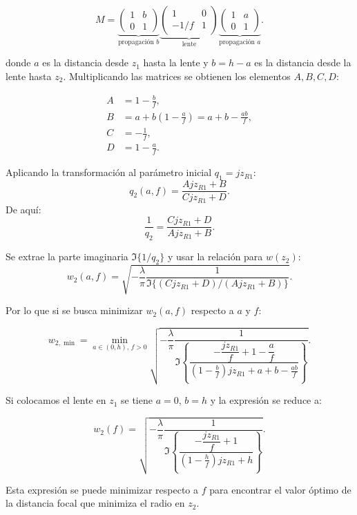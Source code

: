 \documentclass[11pt]{article}
\begin{document}
\[
M = 
\underbrace{\begin{pmatrix}1 & b\\ 0 & 1\end{pmatrix}}_{\text{propagación }b}
\underbrace{\begin{pmatrix}1 & 0\\ -1/f & 1\end{pmatrix}}_{\text{lente}}
\underbrace{\begin{pmatrix}1 & a\\ 0 & 1\end{pmatrix}}_{\text{propagación }a}.
\]

donde \(a\) es la distancia desde \(z_1\) hasta la lente y \(b = h-a\) es la distancia desde la lente hasta \(z_2\). Multiplicando las matrices se obtienen los elementos \(A,B,C,D\):

\begin{align*}
A &= 1 - \frac{b}{f},\\[4pt]
B &= a + b\left(1-\frac{a}{f}\right) = a + b - \frac{ab}{f},\\[4pt]
C &= -\frac{1}{f},\\[4pt]
D &= 1 - \frac{a}{f}.
\end{align*}

Aplicando la transformación al parámetro inicial \(q_1 = j z_{R1}\):
\[
q_2(a,f) = \frac{A j z_{R1} + B}{C j z_{R1} + D}.
\]
De aquí:
\[
\frac{1}{q_2} = \frac{C j z_{R1} + D}{A j z_{R1} + B}.
\]

Se extrae la parte imaginaria \( \Im\{1/q_2\} \) y usar la relación para \(w(z_2)\):
\[
w_2(a,f) = \sqrt{-\frac{\lambda}{\pi} \frac{1}{\Im\{(C j z_{R1} + D)/(A j z_{R1} + B)\}} }.
\]

Por lo que si se busca minimizar \(w_2(a,f)\) respecto a \(a\) y \(f\):

\[
w_{2,\min} = \min_{a\in(0,h),\,f>0} \sqrt{-\frac{\lambda}{\pi} \frac{1}{\Im\!\left\{\dfrac{-\dfrac{j z_{R1}}{f} + 1 - \dfrac{a}{f}}{(1-\tfrac{b}{f})j z_{R1} + a + b - \tfrac{ab}{f}}\right\}} }.
\]

Si colocamos el lente en \(z_1\) se tiene \(a=0\), \(b=h\) y la expresión se reduce a:

\[
w_2(f) = \sqrt{-\frac{\lambda}{\pi} \frac{1}{\Im\!\left\{\dfrac{-\dfrac{j z_{R1}}{f} + 1}{(1-\tfrac{h}{f})j z_{R1} + h}\right\}} }.
\]

Esta expresión se puede minimizar respecto a \(f\) para encontrar el valor óptimo de la distancia focal que minimiza el radio en \(z_2\).

\end{document}
